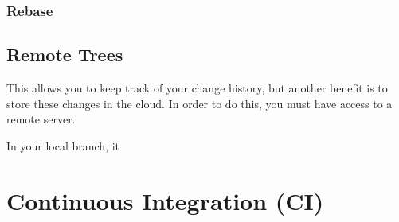 \documentclass{article}
\begin{document}
      \begin{definition}
        
      \end{definition}

    \subsubsection{Rebase}

      \begin{definition}[Rebase]
        
      \end{definition}

      \begin{definition}
        
      \end{definition}
    
  \subsection{Remote Trees}

    This allows you to keep track of your change history, but another benefit is to store these changes in the cloud. In order to do this, you must have access to a remote server. 

    \begin{definition}
      In your local branch, it 
    \end{definition}

    \begin{definition}
      
    \end{definition}

    \begin{definition}[Fetch]
      
    \end{definition}

    \begin{definition}
      
    \end{definition}

    \begin{definition}[Push]
      
    \end{definition}

\section{Continuous Integration (CI)} 
\end{document}
